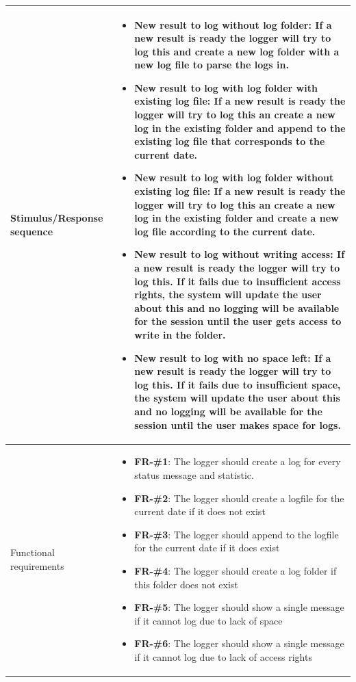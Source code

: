 \documentclass[a4paper]{article}
\begin{document}
\begin{longtable}[l]{ | >{\columncolor{vu-grey-50}}m{110pt} | m{300pt} | }
    Stimulus/Response sequence &
    \begin{itemize}
        \item \textbf{New result to log without log folder}: If a new result is ready the logger will try to log this and create a new log folder with a new log file to parse the logs in.
        \item \textbf{New result to log with log folder with existing log file}: If a new result is ready the logger will try to log this an create a new log in the existing folder and append to the existing log file that corresponds to the current date.
        \item \textbf{New result to log with log folder without existing log file}:  If a new result is ready the logger will try to log this an create a new log in the existing folder and create a new log file according to the current date.
        \item \textbf{New result to log without writing access}: If a new result is ready the logger will try to log this. If it fails due to insufficient access rights, the system will update the user about this and no logging will be available for the session until the user gets access to write in the folder.
        \item \textbf{New result to log with no space left}: If a new result is ready the logger will try to log this. If it fails due to insufficient space, the system will update the user about this and no logging will be available for the session until the user makes space for logs.
    \end{itemize}
    \\ \hline
    
    Functional requirements &
    \begin{itemize}
        \item \textbf{FR-\#1}: The logger should create a log for every status message and statistic.
        \item \textbf{FR-\#2}: The logger should create a logfile for the current date if it does not exist
        \item \textbf{FR-\#3}: The logger should append to the logfile for the current date if it does exist
        \item \textbf{FR-\#4}: The logger should create a log folder if this folder does not exist
        \item \textbf{FR-\#5}: The logger should show a single message if it cannot log due to lack of space
        \item \textbf{FR-\#6}: The logger should show a single message if it cannot log due to lack of access rights
        
    \end{itemize}
    \\ \hline
    
\end{longtable}
\end{document}
